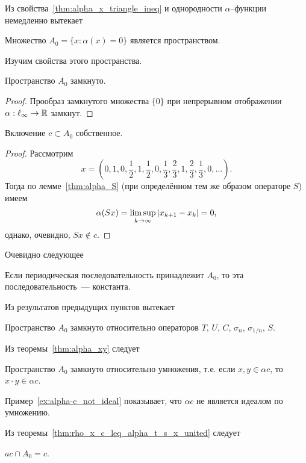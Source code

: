 Из свойства~\ref{thm:alpha_x_triangle_ineq} и однородности $\alpha$--функции немедленно вытекает
\begin{theorem}
	\label{thm:A0_is_space}
	Множество $A_0 = \{x: \alpha(x) = 0\}$
	является пространством.
\end{theorem}
Изучим свойства этого пространства.
\begin{property}
	Пространство $A_0$ замкнуто.
\end{property}
\begin{proof}
	Прообраз замкнутого множества $\{0\}$
	при непрерывном отображении $\alpha : \ell_\infty \to \R$
	замкнут.
\end{proof}
\begin{theorem}
	Включение $c \subset A_0$ собственное.
\end{theorem}
\begin{proof}
	Рассмотрим
	\begin{equation}
		x=\left(
			0,1,
			0,\frac{1}{2},1,\frac{1}{2},
			0,\frac{1}{3},\frac{2}{3},1,\frac{2}{3},\frac{1}{3},
			0,
			...
		\right)
		.
	\end{equation}
	Тогда по лемме~\ref{thm:alpha_S} (при определённом тем же образом операторе $S$) имеем
	\begin{equation}
		\alpha(Sx) = \varlimsup_{k\to\infty} |x_{k+1} - x_{k}| = 0
		,
	\end{equation}
	однако, очевидно, $Sx\notin c$.
\end{proof}
Очевидно следующее
\begin{property}
	Если периодическая последовательность принадлежит $A_0$,
	то эта последовательность~--- константа.
\end{property}

Из результатов предыдущих пунктов вытекает
\begin{theorem}
	Пространство $A_0$ замкнуто относительно операторов $T$, $U$, $C$, $\sigma_n$, $\sigma_{1/n}$, $S$.
\end{theorem}

Из теоремы~\ref{thm:alpha_xy} следует
\begin{theorem}
	Пространство $A_0$ замкнуто относительно умножения,
	т.е. если $x,y\in\alpha c$, то $x\cdot y \in \alpha c$.
\end{theorem}

Пример~\ref{ex:alpha-c_not_ideal} показывает, что $\alpha c$
не является идеалом по умножению.

Из теоремы~\ref{thm:rho_x_c_leq_alpha_t_s_x_united} следует
\begin{theorem}
	$ac \cap A_0 = c$.
\end{theorem}

